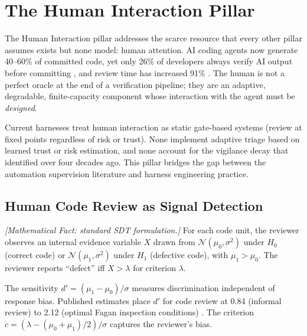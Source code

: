 \section{The Human Interaction Pillar}
\label{sec:human}

The Human Interaction pillar addresses the scarce resource that every other pillar assumes exists but none model: human attention. AI coding agents now generate 40--60\% of committed code, yet only 26\% of developers always verify AI output before committing \citep{sonar2026}, and review time has increased 91\% \citep{dora2025}. The human is not a perfect oracle at the end of a verification pipeline; they are an adaptive, degradable, finite-capacity component whose interaction with the agent must be \emph{designed}.

Current harnesses treat human interaction as static gate-based systems (review at fixed points regardless of risk or trust). None implement adaptive triage based on learned trust or risk estimation, and none account for the vigilance decay that \citet{bainbridge1983ironies} identified over four decades ago. This pillar bridges the gap between the automation supervision literature and harness engineering practice.

\subsection{Human Code Review as Signal Detection}

\begin{definition}
\label{def:sdt}
\emph{[Mathematical Fact: standard SDT formulation.]}
For each code unit, the reviewer observes an internal evidence variable $X$ drawn from $\mathcal{N}(\mu_0, \sigma^2)$ under $H_0$ (correct code) or $\mathcal{N}(\mu_1, \sigma^2)$ under $H_1$ (defective code), with $\mu_1 > \mu_0$. The reviewer reports ``defect'' iff $X > \lambda$ for criterion $\lambda$.
\end{definition}

The sensitivity $d' = (\mu_1 - \mu_0)/\sigma$ measures discrimination independent of response bias. Published estimates place $d'$ for code review at 0.84 (informal review) to 2.12 (optimal Fagan inspection conditions) \citep{fagan1976design, cohen2006best}. The criterion $c = (\lambda - (\mu_0 + \mu_1)/2)/\sigma$ captures the reviewer's bias.

